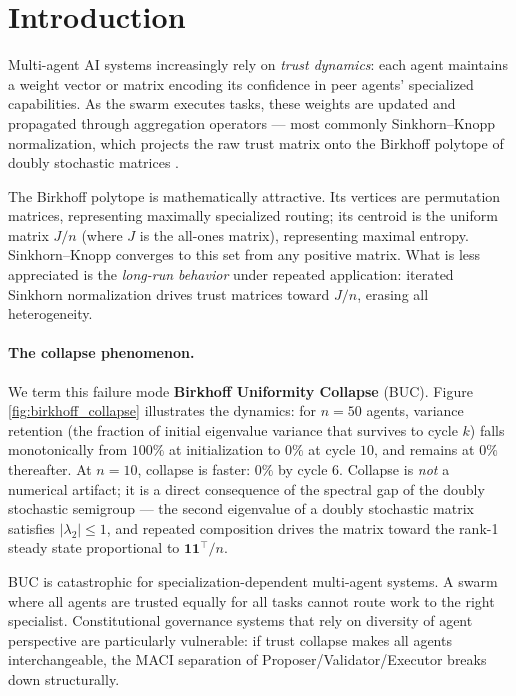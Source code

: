 \section{Introduction}
\label{sec:introduction}

Multi-agent AI systems increasingly rely on \emph{trust dynamics}: each agent
maintains a weight vector or matrix encoding its confidence in peer agents'
specialized capabilities.  As the swarm executes tasks, these weights are updated and
propagated through aggregation operators — most commonly Sinkhorn--Knopp normalization,
which projects the raw trust matrix onto the Birkhoff polytope of doubly stochastic
matrices \cite{sinkhorn1964relationship,sinkhorn1967concerning}.

The Birkhoff polytope is mathematically attractive.  Its vertices are permutation
matrices, representing maximally specialized routing; its centroid is the uniform
matrix $J/n$ (where $J$ is the all-ones matrix), representing maximal entropy.
Sinkhorn--Knopp converges to this set from any positive matrix.  What is less
appreciated is the \emph{long-run behavior} under repeated application: iterated
Sinkhorn normalization drives trust matrices toward $J/n$, erasing all heterogeneity.

\paragraph{The collapse phenomenon.}
We term this failure mode \textbf{Birkhoff Uniformity Collapse} (BUC).  Figure
\ref{fig:birkhoff_collapse} illustrates the dynamics: for $n{=}50$ agents, variance
retention (the fraction of initial eigenvalue variance that survives to cycle $k$) falls
monotonically from $100\%$ at initialization to $0\%$ at cycle $10$, and remains at
$0\%$ thereafter.  At $n{=}10$, collapse is faster: $0\%$ by cycle $6$.  Collapse is
\emph{not} a numerical artifact; it is a direct consequence of the spectral gap of the
doubly stochastic semigroup — the second eigenvalue of a doubly stochastic matrix
satisfies $|\lambda_2| \leq 1$, and repeated composition drives the matrix toward the
rank-1 steady state proportional to $\mathbf{1}\mathbf{1}^\top/n$.

BUC is catastrophic for specialization-dependent multi-agent systems.  A swarm where
all agents are trusted equally for all tasks cannot route work to the right specialist.
Constitutional governance systems that rely on diversity of agent perspective
\cite{bai2022constitutional} are particularly vulnerable: if trust collapse makes all
agents interchangeable, the MACI separation of Proposer/Validator/Executor breaks down
structurally.

